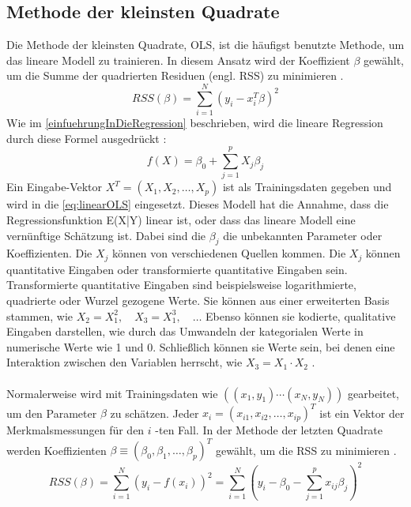 \subsection{Methode der kleinsten Quadrate}
\label{methodederkleinstenquadrate}
Die Methode der kleinsten Quadrate, \ac{OLS}, ist die häufigst benutzte Methode, um das lineare Modell zu trainieren. In diesem Ansatz wird der Koeffizient $\beta$ gewählt, um die Summe der quadrierten Residuen (engl. \ac{RSS}) zu minimieren \cite{hastie2009elements}.  
\begin{equation}
RSS(\beta) = \sum_{i=1}^{N} (y_i - x_i^T \beta)^2 
\label{eq:RSS}
\end{equation}
Wie im \autoref{einfuehrungInDieRegression} beschrieben, wird die lineare Regression durch diese Formel ausgedrückt \cite{hastie2009elements}:
\begin{equation}
f(X) = \beta_0 + \sum_{j=1}^{p} X_j \beta_j 
\label{eq:linearOLS}
\end{equation}
Ein Eingabe-Vektor \( X^T = (X_1, X_2, \ldots, X_p) \) ist als Trainingsdaten gegeben und wird in die \autoref{eq:linearOLS} eingesetzt. Dieses Modell hat die Annahme, dass die Regressionsfunktion E(X|Y) linear ist, oder dass das lineare Modell eine vernünftige Schätzung ist. Dabei sind die $\beta_j$ die unbekannten Parameter oder Koeffizienten. Die \( X_j \) können von verschiedenen Quellen kommen. Die \( X_j \) können quantitative Eingaben oder transformierte quantitative Eingaben sein. Transformierte quantitative Eingaben sind beispielsweise logarithmierte, quadrierte oder Wurzel gezogene Werte. Sie können aus einer erweiterten Basis stammen, wie \( X_2 = X_1^2, \quad X_3 = X_1^3,\quad \ldots \) Ebenso können sie kodierte, qualitative Eingaben darstellen, wie durch das Umwandeln der kategorialen Werte in numerische Werte wie 1 und 0. Schließlich können sie Werte sein, bei denen eine Interaktion zwischen den Variablen herrscht, wie \( X_3 = X_1 \cdot X_2 \) \cite{hastie2009elements}.\\\\
Normalerweise wird mit Trainingsdaten wie \( ( (x_1, y_1) \cdots (x_N, y_N) ) \) gearbeitet, um den Parameter $\beta$ zu schätzen. Jeder \( x_i = (x_{i1}, x_{i2}, \ldots, x_{ip})^T \) ist ein Vektor der Merkmalsmessungen für den \(i\) -ten Fall. In der Methode der letzten Quadrate werden Koeffizienten \( \beta \equiv (\beta_0, \beta_1, \ldots, \beta_p)^T \) gewählt, um die \ac{RSS} zu minimieren \cite{hastie2009elements}. 
\begin{equation}
RSS(\beta) = \sum_{i=1}^{N} (y_i - f(x_i))^2 
= \sum_{i=1}^{N} \left( y_i - \beta_0 - \sum_{j=1}^{p} x_{ij} \beta_j \right)^2
\label{eq:rsshoch2}
\end{equation}
